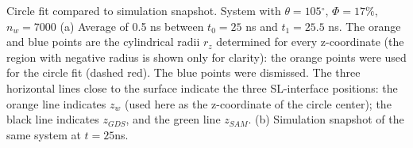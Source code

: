 \label{fig:snapshot-circle-fit} Circle fit compared to simulation
snapshot. System with $\theta=105{^\circ}$, $\Phi=17\%$, $n_{w}=7000$
(a) Average of 0.5 ns between $t_{0}=25$ ns and $t_{1}=25.5$ ns.
The orange and blue points are the cylindrical radii $r_{z}$ determined
for every z-coordinate (the region with negative radius is shown only
for clarity): the orange points were used for the circle fit (dashed
red). The blue points were dismissed. The three horizontal lines close
to the surface indicate the three SL-interface positions: the orange
line indicates $z_{w}$ (used here as the z-coordinate of the circle
center); the black line indicates $z_{GDS}$, and the green line $z_{SAM}$.
(b) Simulation snapshot of the same system at $t=25$ns.
